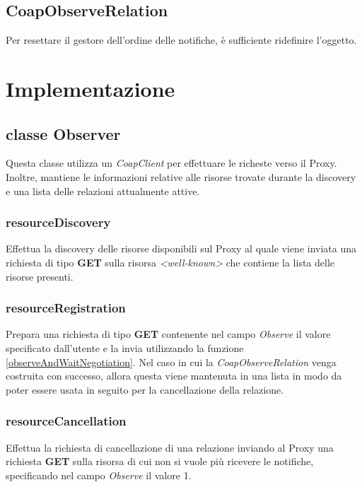 			\subsection{CoapObserveRelation}
				Per resettare il gestore dell'ordine delle notifiche, è sufficiente ridefinire l'oggetto.\newline
				

	\section{Implementazione}
		\subsection{classe Observer}
			Questa classe utilizza un \textit{CoapClient} per effettuare le richeste verso il Proxy. Inoltre, mantiene le informazioni relative alle risorse trovate durante la discovery e una lista delle relazioni attualmente attive.
			\subsubsection{resourceDiscovery}
			Effettua la discovery delle risorse disponibili sul Proxy al quale viene inviata una richiesta di tipo \textbf{GET} sulla risorsa \textit{<well-known>} che contiene la lista delle risorse presenti.
			

			\subsubsection{resourceRegistration}
				Prepara una richiesta di tipo \textbf{GET} contenente nel campo \textit{Observe} il valore specificato dall'utente e la invia utilizzando la funzione \ref{observeAndWaitNegotiation}. Nel caso in cui la \textit{CoapObserveRelation} venga costruita con successo, allora questa viene mantenuta in una lista in modo da poter essere usata in seguito per la cancellazione della relazione.
				

			\subsubsection{resourceCancellation}
				Effettua la richiesta di cancellazione di una relazione inviando al Proxy una richiesta \textbf{GET} sulla risorsa di cui non si vuole più ricevere le notifiche, specificando nel campo \textit{Observe} il valore 1.
				

